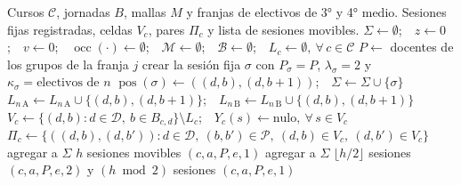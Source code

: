 \documentclass{article}
\begin{document}
\begin{algorithm}[H]
\caption{$\textsc{Preparar}()$}
\label{alg:preparar}
\begin{algorithmic}[1]
\Require Cursos $\mathcal{C}$, jornadas $B$, mallas $M$ y franjas de electivos de 3° y 4° medio.
\Ensure Sesiones fijas registradas, celdas $V_c$, pares $\Pi_c$ y lista de sesiones movibles.
\State $\Sigma \gets \emptyset$;\ \ $z \gets 0$;\ \ $v \gets 0$;\ \ $\operatorname{occ}(\cdot) \gets \emptyset$;\ \ $\mathcal{M} \gets \emptyset$;\ \ $\mathcal{B} \gets \emptyset$;\ \ $L_c \gets \emptyset,\ \forall\, c \in \mathcal{C}$
 
    \State $P \gets$ docentes de los grupos de la franja $j$ 
     
        \State crear la sesión fija $\sigma$ con $P_\sigma = P$, $\lambda_\sigma = 2$ y $\kappa_\sigma = \text{electivos de } n$
        \State $\operatorname{pos}(\sigma) \gets ((d, b), (d, b + 1))$;\ \ $\Sigma \gets \Sigma \cup \{\sigma\}$
        \State $L_{n\,\text{A}} \gets L_{n\,\text{A}} \cup \{(d, b), (d, b+1)\}$;\ \ $L_{n\,\text{B}} \gets L_{n\,\text{B}} \cup \{(d, b), (d, b+1)\}$
    \EndFor
\EndFor
{}
    \State $V_c \gets \{(d, b) : d \in \mathcal{D},\ b \in B_{c,d}\} \setminus L_c$;\ \ $Y_c(s) \gets \text{nulo},\ \forall\, s \in V_c$
    \State $\Pi_c \gets \{((d, b), (d, b')) : d \in \mathcal{D},\ (b, b') \in \mathcal{P},\ (d, b) \in V_c,\ (d, b') \in V_c\}$
\EndFor
{}
        \State agregar a $\Sigma$ $h$ sesiones movibles $(c, a, P, e, 1)$
    \Else
        \State agregar a $\Sigma$ $\lfloor h/2 \rfloor$ sesiones $(c, a, P, e, 2)$ y $(h \bmod 2)$ sesiones $(c, a, P, e, 1)$
    \EndIf
\EndFor
{}
    \State {} 
\EndFor
\end{algorithmic}
\end{algorithm}
\end{document}
